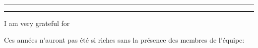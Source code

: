 \begin{otherlanguage}{english}

\hrule\relax
\vspace*{.9\baselineskip}%
\raggedright{\huge{}}\par%
\vspace*{1.1\baselineskip}%
\hrule\relax
\vspace*{\baselineskip}%
\thispagestyle{empty}

\begingroup
\itshape

I am very grateful for 




Ces années n'auront pas été si riches sans la présence des membres de l'équipe:





\endgroup

\clearpage
\mbox{}
\thispagestyle{empty}
\clearpage

%
%
%
%
%
%
%

\end{otherlanguage}
    